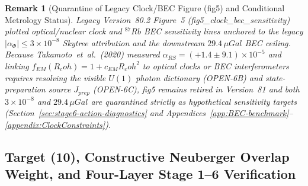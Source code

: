 \documentclass[american,11pt,letterpaper]{article}
\newtheorem{remark}[theorem]{Remark}
\newcommand{\Rcoh}{R_{\mathrm{coh}}}
\def\mathrm#1{#1}%
\def\texttt#1{#1}%
\def\emph#1{#1}%
\def\Rcoh{R_coh}%
\begin{document}
\begin{remark}[Quarantine of Legacy Clock/BEC Figure (\texttt{fig5}) and Conditional Metrology Status]
\label{rem:monograph-fig5-quarantine}
Legacy Version~80.2 Figure~5 (\texttt{fig5\_clock\_bec\_sensitivity}) plotted optical/nuclear clock and $^{87}\mathrm{Rb}$ BEC sensitivity lines anchored to the legacy $|\alpha_\Phi| \le 3\times 10^{-8}$ Skytree attribution and the downstream $29.4\,\mu\mathrm{Gal}$ BEC ceiling. Because Takamoto~\emph{et~al.}\ (2020) measured $\alpha_{\mathrm{RS}} = (+1.4 \pm 9.1)\times 10^{-5}$ and linking $f_{\mathrm{EM}}(\Rcoh) = 1 + c_{\mathrm{EM}}\Rcoh^2$ to optical clocks or BEC interferometers requires resolving the visible $U(1)$ photon dictionary (\texttt{OPEN-6B}) and state-preparation source $J_{\mathrm{prep}}$ (\texttt{OPEN-6C}), \texttt{fig5} remains retired in Version~81 and both $3\times 10^{-8}$ and $29.4\,\mu\mathrm{Gal}$ are quarantined strictly as hypothetical sensitivity targets (Section~\ref{sec:stage6-action-diagnostics} and Appendices~\ref{app:BEC-benchmark}--\ref{appendix:ClockConstraints}).
\end{remark}

\subsection{Target (10), Constructive Neuberger Overlap Weight, and Four-Layer Stage 1--6 Verification}
\end{document}
